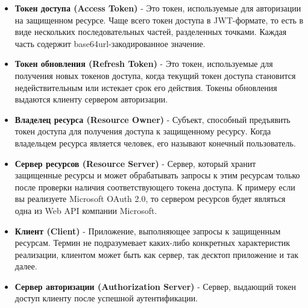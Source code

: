 \begin{itemize}
    \item \textbf{Токен доступа (Access Token)} - Это токен, используемые для авторизации на защищенном ресурсе.
    Чаще всего токен доступа в JWT-формате, то есть в виде нескольких последовательных частей, разделенных точками.
    Каждая часть содержит base64url-закодированное значение.
    \item \textbf{Токен обновления (Refresh Token)} - Это токен, используемые для получения новых токенов доступа,
    когда текущий токен доступа становится недействительным или истекает срок его действия.
    Токены обновления выдаются клиенту сервером авторизации.
    \item \textbf{Владелец ресурса (Resource Owner)} - Субъект, способный предъявить токен доступа для получения доступа к
    защищенному ресурсу.
    Когда владельцем ресурса является человек, его называют конечный пользователь.
    \item \textbf{Сервер ресурсов (Resource Server)} - Сервер, который хранит защищенные ресурсы и может обрабатывать
    запросы к этим ресурсам только после проверки наличия соответствующего токена доступа.
    К примеру если вы реализуете Microsoft OAuth 2.0, то сервером ресурсов будет являться одна из Web API компании Microsoft.
    \item \textbf{Клиент (Client)} - Приложение, выполняющее запросы к защищенным ресурсам.
    Термин не подразумевает каких-либо конкретных характеристик реализации, клиентом может быть как сервер, так десктоп
    приложение и так далее.
    \item \textbf{Сервер авторизации (Authorization Server)} - Сервер, выдающий токен доступ клиенту после
    успешной аутентификации.
\end{itemize}